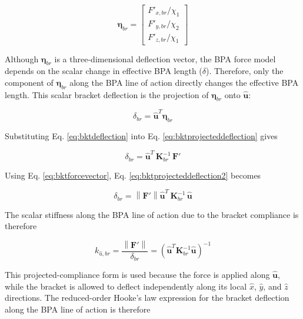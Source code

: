 \begin{equation}
\boldsymbol{\eta}_{br} = \begin{bmatrix} F'_{x,br}/\chi_{1} \\ F'_{y,br}/\chi_{2} \\ F'_{z,br}/\chi_{1} \end{bmatrix}
\label{eq:bktcomponentdeflection}
\end{equation}

Although $\boldsymbol{\eta}_{br}$ is a three-dimensional deflection vector, the BPA force model depends on the scalar change in effective BPA length ($\delta$). Therefore, only the component of $\boldsymbol{\eta}_{br}$ along the BPA line of action directly changes the effective BPA length. This scalar bracket deflection is the projection of $\boldsymbol{\eta}_{br}$ onto $\hat{\mathbf{u}}$:

\begin{equation}
{\delta}_{br} = \hat{\mathbf{u}}^{T} \boldsymbol{\eta}_{br}
\label{eq:bktprojecteddeflection}
\end{equation}

Substituting Eq. \ref{eq:bktdeflection} into Eq. \ref{eq:bktprojecteddeflection} gives

\begin{equation}
{\delta}_{br} = \hat{\mathbf{u}}^{T} \, \mathbf{K}_{br}^{-1} \, \mathbf{F}'
\label{eq:bktprojecteddeflection2}
\end{equation}

Using Eq. \ref{eq:bktforcevector}, Eq. \ref{eq:bktprojecteddeflection2} becomes

\begin{equation}
\delta_{br} = \left\| \mathbf{F}' \right\| \hat{\mathbf{u}}^{T} \, \mathbf{K}_{br}^{-1} \, \hat{\mathbf{u}}
\label{eq:bktprojectedcompliance}
\end{equation}

The scalar stiffness along the BPA line of action due to the bracket compliance is therefore

\begin{equation}
k_{\hat{u},br} = \frac{\left\| \mathbf{F}' \right\|}{\delta_{br}} = \left( \hat{\mathbf{u}}^{T} \mathbf{K}_{br}^{-1} \hat{\mathbf{u}} \right)^{-1}
\label{eq:keff}
\end{equation}

This projected-compliance form is used because the force is applied along $\hat{\mathbf{u}}$, while the bracket is allowed to deflect independently along its local $\hat{x}$, $\hat{y}$, and $\hat{z}$ directions. The reduced-order Hooke's law expression for the bracket deflection along the BPA line of action is therefore

